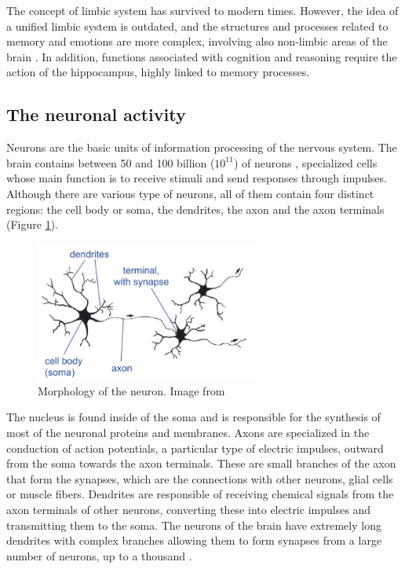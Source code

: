 The concept of limbic system has survived to modern times. However, the idea of a unified limbic system is outdated, and the structures and processes related to memory and emotions are more complex, involving also non-limbic areas of the brain \citep{Rolls2015}. In addition,  functions associated with cognition and reasoning require the action of the hippocampus, highly linked to memory processes.

\subsection{The neuronal activity}

Neurons are the basic units of information processing of the nervous system. The brain contains between 50 and 100 billion ($10^{11}$) of neurons \citep{Andreassi2007}, specialized cells whose main function is to receive stimuli and send responses through impulses. Although there are various type of neurons, all of them contain four distinct regions: the cell body or soma, the dendrites, the axon and the axon terminals (Figure \ref{fig:neuron}). 

\begin{figure}[ht]
\centering
\includegraphics[width=0.65\textwidth]{Images/Neuron.jpg}
\caption{Morphology of the neuron. Image from \citet{Carpenter2012}}
\label{fig:neuron}
\end{figure}


The nucleus is found inside of the soma and is responsible for the synthesis of most of the neuronal proteins and membranes. Axons are specialized in the conduction of action potentials, a particular type of electric impulses, outward from the soma towards the axon terminals. These are small branches of the axon that form the synapses, which are the connections with other neurons, glial cells or muscle fibers. Dendrites are responsible of receiving chemical signals from the axon terminals of other neurons, converting these into electric impulses and transmitting them to the soma. The neurons of the brain have extremely long dendrites with complex branches allowing them to form synapses from a large number of neurons, up to a thousand \citep{Lodish2000}. 


